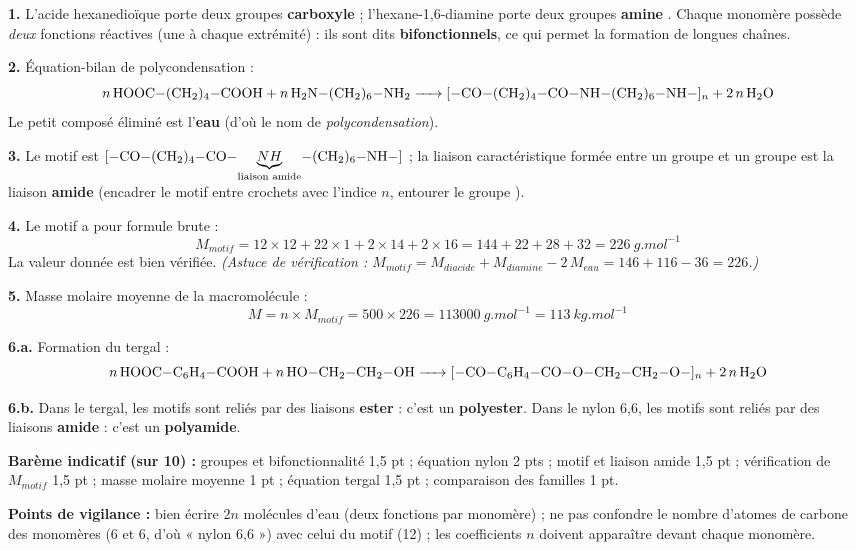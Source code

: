 \documentclass[11pt]{article}
\begin{document}
\begin{corrige}
\textbf{1.} L'acide hexanedioïque porte deux groupes \textbf{carboxyle}  ; l'hexane-1,6-diamine porte deux groupes \textbf{amine} . Chaque monomère possède \emph{deux} fonctions réactives (une à chaque extrémité) : ils sont dits \textbf{bifonctionnels}, ce qui permet la formation de longues chaînes.

\textbf{2.} Équation-bilan de polycondensation :
\[ \ce{n HOOC-(CH2)4-COOH + n H2N-(CH2)6-NH2 -> [-CO-(CH2)4-CO-NH-(CH2)6-NH-]_n + 2n H2O} \]
Le petit composé éliminé est l'\textbf{eau} (d'où le nom de \emph{polycondensation}).

\textbf{3.} Le motif est $\ce{[-CO-(CH2)4-CO-\underset{\text{liaison amide}}{\underbrace{NH}}-(CH2)6-NH-]}$ ; la liaison caractéristique formée entre un groupe  et un groupe  est la liaison \textbf{amide}  (encadrer le motif entre crochets avec l'indice $n$, entourer le groupe ).

\textbf{4.} Le motif a pour formule brute  :
\[ M_{motif} = 12 \times 12 + 22 \times 1 + 2 \times 14 + 2 \times 16 = 144 + 22 + 28 + 32 = \SI{226}{g.mol^{-1}} \]
La valeur donnée est bien vérifiée. \emph{(Astuce de vérification : $M_{motif} = M_{diacide} + M_{diamine} - 2\,M_{eau} = 146 + 116 - 36 = 226$.)}

\textbf{5.} Masse molaire moyenne de la macromolécule :
\[ M = n \times M_{motif} = 500 \times 226 = \boxed{\SI{113000}{g.mol^{-1}}} = \SI{113}{kg.mol^{-1}} \]

\textbf{6.a.} Formation du tergal :
\[ \ce{n HOOC-C6H4-COOH + n HO-CH2-CH2-OH -> [-CO-C6H4-CO-O-CH2-CH2-O-]_n + 2n H2O} \]

\textbf{6.b.} Dans le tergal, les motifs sont reliés par des liaisons \textbf{ester}  : c'est un \textbf{polyester}. Dans le nylon 6,6, les motifs sont reliés par des liaisons \textbf{amide}  : c'est un \textbf{polyamide}.

\smallskip
\textbf{Barème indicatif (sur 10) :} groupes et bifonctionnalité 1,5 pt ; équation nylon 2 pts ; motif et liaison amide 1,5 pt ; vérification de $M_{motif}$ 1,5 pt ; masse molaire moyenne 1 pt ; équation tergal 1,5 pt ; comparaison des familles 1 pt.

\textbf{Points de vigilance :} bien écrire $2n$ molécules d'eau (deux fonctions par monomère) ; ne pas confondre le nombre d'atomes de carbone des monomères (6 et 6, d'où « nylon 6,6 ») avec celui du motif (12) ; les coefficients $n$ doivent apparaître devant chaque monomère.
\end{corrige}
\end{document}
